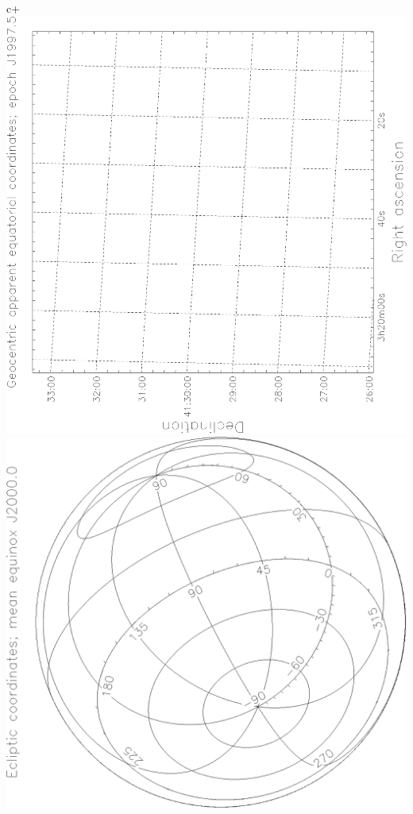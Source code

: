 \documentclass[twoside,11pt]{article}
\newenvironment{latexonly}{}{}
\begin{document}
\begin{latexonly}
   \begin{center}
   \mbox{}\hfill
c+
   \includegraphics[scale=0.25,angle=-90]{sun211_figures/fronta_bw.eps}\hfill
   \includegraphics[scale=0.25,angle=-90]{sun211_figures/frontb_bw.eps}\hfill

\end{center}
\end{latexonly}
\end{document}
